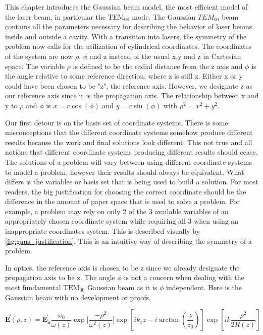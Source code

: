\documentclass[11pt,a4paper]{book}
\begin{document}
	This chapter introduces the Gaussian beam model, the most efficient model of the laser beam, in particular the $\text{TEM}_{00}$ mode. The Gaussian $TEM_{00}$ beam contains all the parameters necessary for describing the behavior of laser beams inside and outside a cavity. With a transition into lasers, the symmetry of the problem now calls for the utilization of cylindrical coordinates. The coordinates of the system are now $\rho$, $\phi$ and z instead of the usual x,y and z in Cartesian space. The variable $\rho$ is defined to be the radial distance from the z axis and $\phi$ is the angle relative to some reference direction, where z is still z. Either x or y could have been chosen to be "z", the reference axis. However, we designate z as our reference axis since it is the propagation axis. The relationship between x and y to $\rho$ and $\phi$ is $x=r\cos{(\phi)} \text{ and } y=r\sin{(\phi)}$ with $\rho^2 = x^2 +y^2$. 
	
	Our first detour is on the basis set of coordinate systems. There is some misconceptions that the different coordinate systems somehow produce different results because the work and final solutions look different. This not true and all notions that different coordinate systems producing different results should cease. The solutions of a problem will vary between using different coordinate systems to model a problem, however their results should always be equivalent. What differs is the variables or basis set that is being used to build a solution. For most readers, the big justification for choosing the correct coordinate should be the difference in the amount of paper space that is used to solve a problem. For example, a problem may rely on only 2 of the 3 available variables of an appropriately chosen coordinate system while requiring all 3 when using an inappropriate coordinates system. This is described visually by \autoref{fig:gaus_justification}. This is an intuitive way of describing the symmetry of a problem.
	
	In optics, the reference axis is chosen to be z since we already designate the propagation axis to be z. The angle $\phi$ is not a concern when dealing with the most fundamental $\text{TEM}_{00}$ Gaussian beam as it is $\phi$ independent. Here is the Gaussian beam with no development or proofs. 
	
	\begin{equation}
	\label {eq:Gaussian Beam}
	\vec{\textbf{E}}(\rho,z)=\vec{\textbf{E}}_\textbf{o} 
	\frac{\omega_{0}}{\omega(z)} 
	\exp\bigg[\dfrac{-\rho^2}{\omega^2(z)}\bigg] \exp{\left[ik_z z - i \arctan{\left(\frac{z}{z_0}\right)}\right]}\exp{\left[ik \dfrac{\rho^2}{2R(z)} \right]}
	\end{equation}
	
\end{document}
